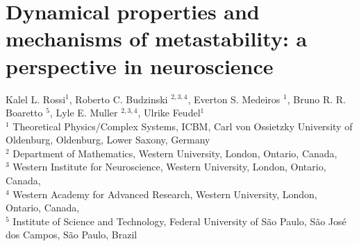 \chapter{Dynamical properties and mechanisms of metastability: a perspective in neuroscience}\label{chap:metastability}


\begin{center}
    {\large Kalel L. Rossi$^{1}$, Roberto C. Budzinski $^{2,3,4}$, Everton S. Medeiros $^{1}$, Bruno R. R. Boaretto $^{5}$, Lyle E. Muller $^{2,3,4}$, Ulrike Feudel$^{1}$ } \\[1em]
    {\small $^1$ Theoretical Physics/Complex Systems, ICBM, Carl von Ossietzky University of Oldenburg, Oldenburg, Lower Saxony, Germany \\ $^2$ Department of Mathematics, Western University, London, Ontario, Canada, \\ $^3$ Western Institute for Neuroscience, Western University, London, Ontario, Canada, \\ $^4$ Western Academy for Advanced Research, Western University, London, Ontario, Canada, \\ $^5$ Institute of Science and Technology, Federal University of São Paulo, São José dos Campos, São Paulo, Brazil}
\end{center}


